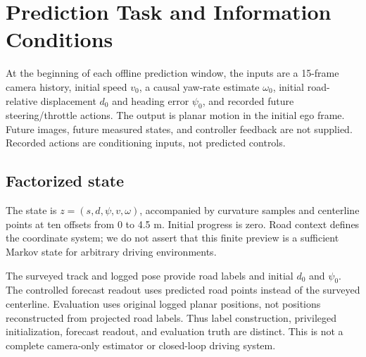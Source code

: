 \documentclass[preprint,12pt]{elsarticle}
\begin{document}
\section{Prediction Task and Information Conditions}\label{sec:problem}
At the beginning of each offline prediction window, the inputs are a 15-frame
camera history, initial speed $v_0$, a causal yaw-rate estimate $\omega_0$,
initial road-relative displacement $d_0$ and heading error $\psi_0$, and recorded
future steering/throttle actions. The output is planar motion in the initial
ego frame. Future images, future measured states, and controller feedback are
not supplied. Recorded actions are conditioning inputs, not predicted controls.

\subsection{Factorized state}\label{sec:factorized_state}
The state is $z=(s,d,\psi,v,\omega)$, accompanied by curvature samples and
centerline points at ten offsets from 0 to 4.5 m. Initial progress is zero.
Road context defines the coordinate system; we do not assert that this finite
preview is a sufficient Markov state for arbitrary driving environments.

The surveyed track and logged pose provide road labels and initial $d_0$ and
$\psi_0$. The controlled forecast readout uses predicted road points instead
of the surveyed centerline. Evaluation uses original logged planar positions,
not positions reconstructed from projected road labels. Thus label construction,
privileged initialization, forecast readout, and evaluation truth are distinct.
This is not a complete camera-only estimator or closed-loop driving system.
\end{document}
